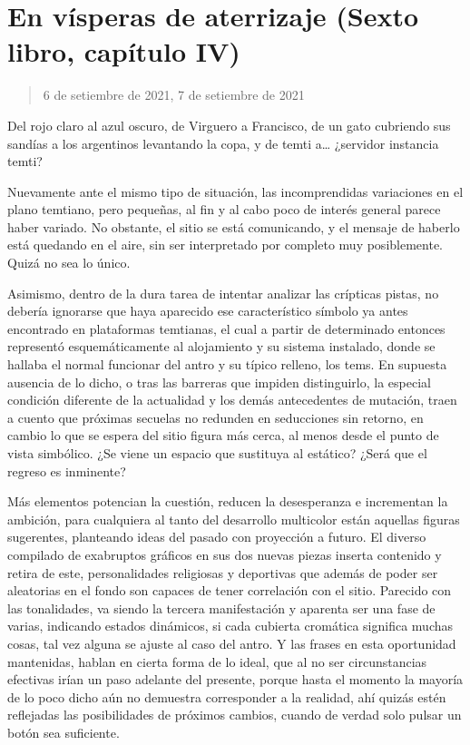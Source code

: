 \documentclass[
]{book}
\begin{document}
\hypertarget{en-vuxedsperas-de-aterrizaje-sexto-libro-capuxedtulo-iv}{%
\section{En vísperas de aterrizaje (Sexto libro, capítulo IV)}\label{en-vuxedsperas-de-aterrizaje-sexto-libro-capuxedtulo-iv}}

\begin{quote}
6 de setiembre de 2021, 7 de setiembre de 2021
\end{quote}

Del rojo claro al azul oscuro, de Virguero a Francisco, de un gato cubriendo sus sandías a los argentinos levantando la copa, y de temti a\ldots{} ¿servidor instancia temti?

Nuevamente ante el mismo tipo de situación, las incomprendidas variaciones en el plano temtiano, pero pequeñas, al fin y al cabo poco de interés general parece haber variado. No obstante, el sitio se está comunicando, y el mensaje de haberlo está quedando en el aire, sin ser interpretado por completo muy posiblemente. Quizá no sea lo único.

Asimismo, dentro de la dura tarea de intentar analizar las crípticas pistas, no debería ignorarse que haya aparecido ese característico símbolo ya antes encontrado en plataformas temtianas, el cual a partir de determinado entonces representó esquemáticamente al alojamiento y su sistema instalado, donde se hallaba el normal funcionar del antro y su típico relleno, los tems. En supuesta ausencia de lo dicho, o tras las barreras que impiden distinguirlo, la especial condición diferente de la actualidad y los demás antecedentes de mutación, traen a cuento que próximas secuelas no redunden en seducciones sin retorno, en cambio lo que se espera del sitio figura más cerca, al menos desde el punto de vista simbólico. ¿Se viene un espacio que sustituya al estático? ¿Será que el regreso es inminente?

Más elementos potencian la cuestión, reducen la desesperanza e incrementan la ambición, para cualquiera al tanto del desarrollo multicolor están aquellas figuras sugerentes, planteando ideas del pasado con proyección a futuro. El diverso compilado de exabruptos gráficos en sus dos nuevas piezas inserta contenido y retira de este, personalidades religiosas y deportivas que además de poder ser aleatorias en el fondo son capaces de tener correlación con el sitio. Parecido con las tonalidades, va siendo la tercera manifestación y aparenta ser una fase de varias, indicando estados dinámicos, si cada cubierta cromática significa muchas cosas, tal vez alguna se ajuste al caso del antro. Y las frases en esta oportunidad mantenidas, hablan en cierta forma de lo ideal, que al no ser circunstancias efectivas irían un paso adelante del presente, porque hasta el momento la mayoría de lo poco dicho aún no demuestra corresponder a la realidad, ahí quizás estén reflejadas las posibilidades de próximos cambios, cuando de verdad solo pulsar un botón sea suficiente.
\end{document}

